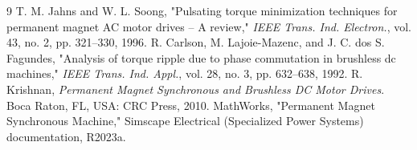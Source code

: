 \documentclass[11pt,a4paper]{article}
\begin{document}
\begin{thebibliography}{9}
\small
{} T. M. Jahns and W. L. Soong, "Pulsating torque minimization techniques for permanent magnet AC motor drives -- A review," \emph{IEEE Trans. Ind. Electron.}, vol. 43, no. 2, pp. 321–330, 1996.
 R. Carlson, M. Lajoie-Mazenc, and J. C. dos S. Fagundes, "Analysis of torque ripple due to phase commutation in brushless dc machines," \emph{IEEE Trans. Ind. Appl.}, vol. 28, no. 3, pp. 632–638, 1992.
 R. Krishnan, \emph{Permanent Magnet Synchronous and Brushless DC Motor Drives}. Boca Raton, FL, USA: CRC Press, 2010.
 MathWorks, "Permanent Magnet Synchronous Machine," Simscape Electrical (Specialized Power Systems) documentation, R2023a.
\end{thebibliography}
\end{document}
